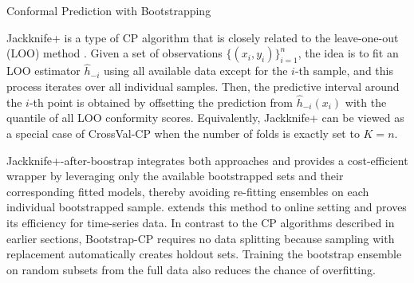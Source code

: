 \documentclass[a4paper,oneside,bibliography=totoc]{scrbook}
\begin{document}
\begin{algorithm}[t]
  \caption{Conformal Prediction with Bootstrapping}
  \label{alg:BtCP}
  \begin{algorithmic}[1]
    \textbf{Input:} 
    A set of observations $\{(x_{i}, y_{i})\}_{i=1}^n$, number of bootstraps $B$, a prediction algorithm $h(\cdot)$, a non-conformity measure $\myfunc{s(\cdot)}$, nominal mis-coverage rate $\tau$, test data $x_{n+1}$. \vskip
    \textbf{Output:} a prediction set $\mathcal{C}_{\tau}(x_{n+1})}$ that covers $y_{n+1}$ with probability $1-\tau$. \vskip
    \vspace{0.5em}
    \STATE Sample all available data with replacement and create $B$ subsets. $I_b$ denotes the indices of data points included in the $b$-th sample.
    \STATE Train $\hat{h}_{b}(\cdot)$ on $\{(x_{i}, y_{i}) \mid i \in I_b\}$ for $b$ in 1, 2, ..., B
    \STATE Initialise a conformity scoring set $S=\emptyset$
    \FOR {$i$ in 1, 2, ..., n}
    	\begin{enumerate}
    		\STATE Initialize an empty for leave-one-out estimates $LOO_i=\emptyset$
    		\STATE For {$b$ in 1, 2, ..., B},  if {$i$ \notin \; $I_b$}\;: $LOO_i \leftarrow{LOO_i \cup \hat{h}_b(x_i)}$ 
			\STATE S \gets S \cup s\big(aggregate(LOO_i),\; y_i\big)
		\end{enumerate}
    \ENDFOR
	\STATE Predict $x_{n+1}$: $h(x_{n+1}) \leftarrow aggregate(\{\hat{h}_{1}(x_{n+1}), ..., \hat{h}_{B}(x_{n+1})\})$ 
	\STATE Return $\mathcal{C}_{\tau}(x_{n+1}) \leftarrow \{y \,|\, s((h(x_{n+1}), y) \leq q\}$, where $q$ is the $\lceil(1-\tau)(n_s+1)\rceil$-th smallest value of $S$, with $n_s = |S|$.
    \end{algorithmic}
\end{algorithm}


Jackknife+ is a type of CP algorithm that is closely related to the leave-one-out (LOO) method \cite{barber2020jackknife}. Given a set of observations $\{(x_{i}, y_{i})\}_{i=1}^n$, the idea is to fit an LOO estimator $\hat{h}_{-i}$ using all available data except for the $i$-th sample, and this process iterates over all individual samples. Then, the predictive interval around the $i$-th point is obtained by offsetting the prediction from $\hat{h}_{-i}(x_i)$ with the quantile of all LOO conformity scores.  Equivalently, Jackknife+ can be viewed as a special case of CrossVal-CP when the number of folds is exactly set to $K=n$.

Jackknife+-after-boostrap \cite{kim2020predictive} integrates both approaches and provides a cost-efficient wrapper by leveraging only the available bootstrapped sets and their corresponding fitted models, thereby avoiding re-fitting ensembles on each individual bootstrapped sample. \cite{pmlr-v139-xu21h} extends this method to online setting and proves its efficiency for time-series data. In contrast to the CP algorithms described in earlier sections, Bootstrap-CP requires no data splitting because sampling with replacement automatically creates holdout sets. Training the bootstrap ensemble on random subsets from the full data also reduces the chance of overfitting.
\end{document}
